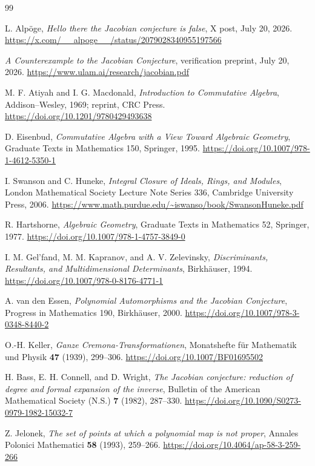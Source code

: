 \begin{thebibliography}{99}

L. Alp\"oge,
\emph{Hello there the Jacobian conjecture is false},
X post, July 20, 2026.
\url{https://x.com/__alpoge__/status/2079028340955197566}

\emph{A Counterexample to the Jacobian Conjecture},
verification preprint, July 20, 2026.
\url{https://www.ulam.ai/research/jacobian.pdf}

M. F. Atiyah and I. G. Macdonald,
\emph{Introduction to Commutative Algebra},
Addison--Wesley, 1969; reprint, CRC Press.
\url{https://doi.org/10.1201/9780429493638}

D. Eisenbud,
\emph{Commutative Algebra with a View Toward Algebraic Geometry},
Graduate Texts in Mathematics 150, Springer, 1995.
\url{https://doi.org/10.1007/978-1-4612-5350-1}

I. Swanson and C. Huneke,
\emph{Integral Closure of Ideals, Rings, and Modules},
London Mathematical Society Lecture Note Series 336, Cambridge University Press, 2006.
\url{https://www.math.purdue.edu/~iswanso/book/SwansonHuneke.pdf}

R. Hartshorne,
\emph{Algebraic Geometry},
Graduate Texts in Mathematics 52, Springer, 1977.
\url{https://doi.org/10.1007/978-1-4757-3849-0}

I. M. Gel'fand, M. M. Kapranov, and A. V. Zelevinsky,
\emph{Discriminants, Resultants, and Multidimensional Determinants},
Birkh\"auser, 1994.
\url{https://doi.org/10.1007/978-0-8176-4771-1}

A. van den Essen,
\emph{Polynomial Automorphisms and the Jacobian Conjecture},
Progress in Mathematics 190, Birkh\"auser, 2000.
\url{https://doi.org/10.1007/978-3-0348-8440-2}

O.-H. Keller,
\emph{Ganze Cremona-Transformationen},
Monatshefte f\"ur Mathematik und Physik \textbf{47} (1939), 299--306.
\url{https://doi.org/10.1007/BF01695502}

H. Bass, E. H. Connell, and D. Wright,
\emph{The Jacobian conjecture: reduction of degree and formal expansion of the inverse},
Bulletin of the American Mathematical Society (N.S.) \textbf{7} (1982), 287--330.
\url{https://doi.org/10.1090/S0273-0979-1982-15032-7}

Z. Jelonek,
\emph{The set of points at which a polynomial map is not proper},
Annales Polonici Mathematici \textbf{58} (1993), 259--266.
\url{https://doi.org/10.4064/ap-58-3-259-266}


\end{thebibliography}
